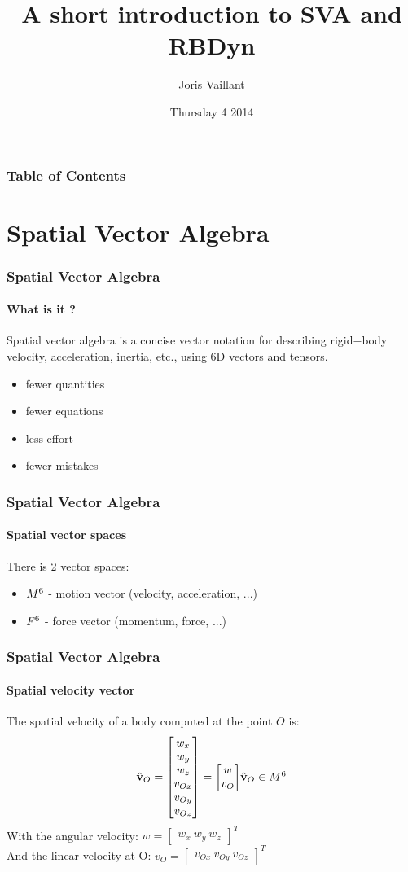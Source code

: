\documentclass{beamer}
\title
{A short introduction to SVA and RBDyn}
\author
{Joris Vaillant}
\institute{LIRMM}{}
\date{Thursday 4 2014}
\begin{document}
	\frame{\titlepage}

	\begin{frame}
		\frametitle{Table of Contents}
		\tableofcontents
  	\end{frame}


	\section{Spatial Vector Algebra}
  	\begin{frame}
		\frametitle{Spatial Vector Algebra}
		\framesubtitle{What is it ?}
		Spatial vector algebra is a concise vector notation for describing rigid−body velocity,
		acceleration, inertia, etc., using 6D vectors and tensors.
		\begin{itemize}
			\item fewer quantities
			\item fewer equations
			\item less effort
			\item fewer mistakes
		\end{itemize}
  	\end{frame}


  	\begin{frame}
		\frametitle{Spatial Vector Algebra}
		\framesubtitle{Spatial vector spaces}
		There is 2 vector spaces:
		\begin{itemize}
			\item $ M^{6} $ - motion vector (velocity, acceleration, ...)
			\item $ F^{6} $ - force vector (momentum, force, ...)
		\end{itemize}
  	\end{frame}


  	\begin{frame}
		\frametitle{Spatial Vector Algebra}
		\framesubtitle{Spatial velocity vector}
		The spatial velocity of a body computed at the point $ O $ is:
		\begin{subequations}
			$$
			\velocityvecHatOrigin{O} = \begin{bmatrix} w_x \\ w_y \\ w_z \\ v_{Ox} \\ v_{Oy} \\ v_{Oz} \end{bmatrix} = \begin{bmatrix} w \\ v_O \end{bmatrix}
			$$
			$$
			\velocityvecHatOrigin{O} \in \motionspace{6}
			$$
		\end{subequations}
		With the angular velocity:
		$ w = \begin{bmatrix} w_x\ w_y\ w_z \end{bmatrix}^T $\\
		And the linear velocity at O:
		$ v_O = \begin{bmatrix} v_{Ox}\ v_{Oy}\ v_{Oz} \end{bmatrix}^T $
	\end{frame}
\end{document}
